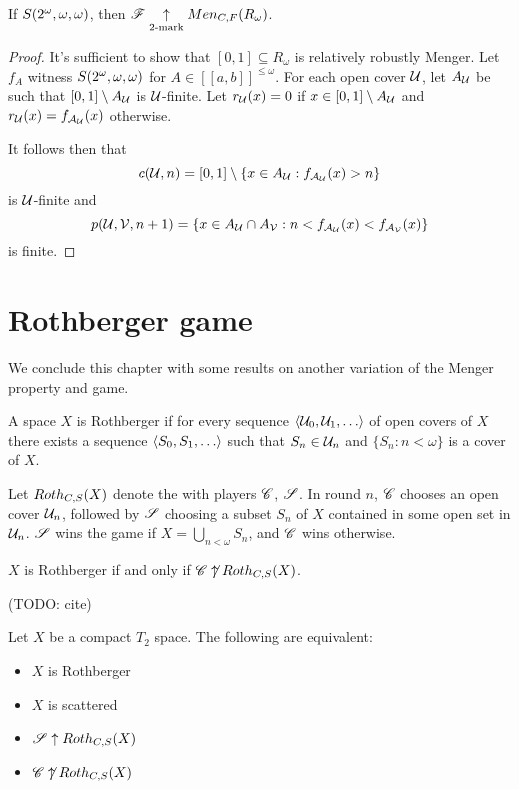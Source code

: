 \begin{thm}
  If $S(2^\omega,\omega,\omega)$, then $\mathscr{F}\underset{2\text{-mark}}{\uparrow}Men_{C,F}(R_\omega)$.
\end{thm}

\begin{proof}
  It's sufficient to show that $[0,1]\subseteq R_\omega$ is relatively
  robustly Menger. Let $f_A$ witness $S(2^\omega,\omega,\omega)$
  for $A\in[[a,b]]^{\leq\omega}$.
  For each open cover $\mathcal{U}$, let $A_{\mathcal{U}}$ be
  such that $[0,1]\setminus A_{\mathcal{U}}$ is $\mathcal{U}$-finite.
  Let $r_{\mathcal{U}}(x)=0$ if $x\in[0,1]\setminus A_{\mathcal{U}}$ and
  $r_{\mathcal{U}}(x)=f_{\mathcal{A}_{\mathcal{U}}}(x)$ otherwise.

  It follows then that
    \[
      c(\mathcal{U},n) = [0,1]\setminus\{x\in A_{\mathcal{U}}:f_{\mathcal{A}_{\mathcal{U}}}(x)>n\}
    \]
  is $\mathcal{U}$-finite and
    \[
      p(\mathcal{U},\mathcal{V},n+1)
        =
      \{x\in A_{\mathcal{U}}\cap A_{\mathcal{V}}
        :
      n<f_{\mathcal{A}_{\mathcal{U}}}(x)<f_{\mathcal{A}_{\mathcal{V}}}(x)\}
    \]
  is finite.
\end{proof}


\section{Rothberger game}

We conclude this chapter with some results on another variation of the
Menger property and game.

\begin{defn}
  A space $X$ is Rothberger if for every sequence $\<\mc U_0,\mc U_1,\dots\>$
  of open covers of $X$ there exists a sequence
  $\<S_0,S_1,\dots\>$ such that $S_n\in\mathcal{U}_n$
  and $\{S_n:n<\omega\}$ is a cover of $X$.
\end{defn}

\begin{game}
  Let $Roth_{C,S}(X)$ denote the  with players $\mathscr{C}$,
  $\mathscr{S}$.
  In round $n$, $\mathscr{C}$ chooses an open cover $\mathcal{U}_n$, followed by $\mathscr{S}$
  choosing a subset $S_n$ of $X$ contained in some open set in $\mathcal{U}_n$.
  $\mathscr{S}$ wins the game if $X = \bigcup_{n<\omega}S_n$,
  and $\mathscr{C}$ wins otherwise.
\end{game}

\begin{thm}
  $X$ is Rothberger if and only if $\mathscr{C}\not\uparrow Roth_{C,S}(X)$.
  \cite{MR1279482}
\end{thm}

(TODO: cite)

\begin{thm}
  Let $X$ be a compact $T_2$ space. The following are equivalent:
    \begin{itemize}
      \item $X$ is Rothberger
      \item $X$ is scattered
      \item $\mathscr{S}\uparrow Roth_{C,S}(X)$
      \item $\mathscr{C}\not\uparrow Roth_{C,S}(X)$
    \end{itemize}
\end{thm}

